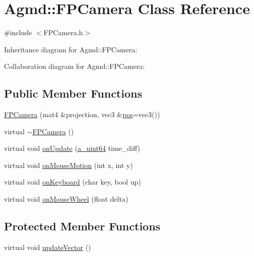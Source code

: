 \hypertarget{class_agmd_1_1_f_p_camera}{\section{Agmd\+:\+:F\+P\+Camera Class Reference}
\label{class_agmd_1_1_f_p_camera}
}


{\ttfamily \#include $<$F\+P\+Camera.\+h$>$}



Inheritance diagram for Agmd\+:\+:F\+P\+Camera\+:


Collaboration diagram for Agmd\+:\+:F\+P\+Camera\+:
\subsection*{Public Member Functions}
\begin{DoxyCompactItemize}
\item 
\hyperlink{class_agmd_1_1_f_p_camera_acc563d13e0186798ea977df46a12206d}{F\+P\+Camera} (mat4 \&projection, vec3 \&\hyperlink{_examples_2_planet_2_app_8cpp_aa8a1c0491559faca4ebd0881575ae7f0}{pos}=vec3())
\item 
virtual \hyperlink{class_agmd_1_1_f_p_camera_a7ae7a6acdc0db1232cfd8c31d197eea4}{$\sim$\+F\+P\+Camera} ()
\item 
virtual void \hyperlink{class_agmd_1_1_f_p_camera_a1bc885fd822549508eba316b5769dba7}{on\+Update} (\hyperlink{_common_defines_8h_a6c5192ec3c55d6e5b13d2dbaa082bdea}{a\+\_\+uint64} time\+\_\+diff)
\item 
virtual void \hyperlink{class_agmd_1_1_f_p_camera_a274638b1a462deae004030eca6035e8c}{on\+Mouse\+Motion} (int x, int y)
\item 
virtual void \hyperlink{class_agmd_1_1_f_p_camera_ac651ebdc3a7c6dd40826062a833cb28f}{on\+Keyboard} (char key, bool up)
\item 
virtual void \hyperlink{class_agmd_1_1_f_p_camera_a6505ad6e0cc8886ee0e3a325970fd22e}{on\+Mouse\+Wheel} (float delta)
\end{DoxyCompactItemize}
\subsection*{Protected Member Functions}
\begin{DoxyCompactItemize}
\item 
virtual void \hyperlink{class_agmd_1_1_f_p_camera_ae46147dbb6541ed1c13b4c864c41df42}{update\+Vector} ()
\end{DoxyCompactItemize}
